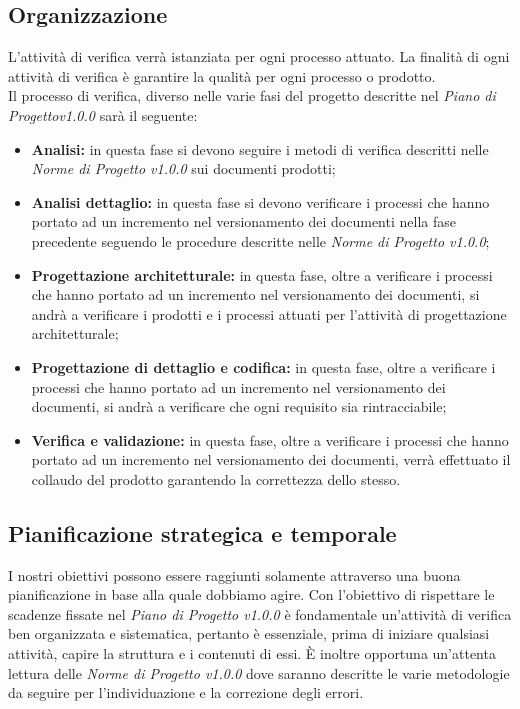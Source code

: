 \subsection{Organizzazione}
L'attività di verifica verrà istanziata per ogni processo attuato. La finalità di ogni attività di verifica è garantire la qualità per ogni processo o prodotto.\\
Il processo di verifica, diverso nelle varie fasi del progetto descritte nel \textit{Piano di Progettov1.0.0} sarà il seguente:
\begin{itemize}
	\item \textbf{Analisi:} in questa fase si devono seguire i metodi di verifica descritti nelle \textit{Norme di Progetto v1.0.0} sui documenti prodotti;
	\item \textbf{Analisi dettaglio:} in questa fase si devono verificare i processi che hanno portato ad un incremento nel versionamento dei documenti nella fase precedente seguendo le procedure descritte nelle \textit{Norme di Progetto v1.0.0};
	\item \textbf{Progettazione architetturale:} in questa fase, oltre a verificare i processi che hanno portato ad un incremento nel versionamento dei documenti, si andrà a verificare i prodotti e i processi attuati per l'attività di progettazione architetturale;
	\item \textbf{Progettazione di dettaglio e codifica:} in questa fase, oltre a verificare i processi che hanno portato ad un incremento nel versionamento dei documenti, si andrà a verificare che ogni requisito sia rintracciabile;
	\item \textbf{Verifica e validazione:} in questa fase, oltre a verificare i processi che hanno portato ad un incremento nel versionamento dei documenti, verrà effettuato il collaudo del prodotto garantendo la correttezza dello stesso.
\end{itemize} 

\subsection{Pianificazione strategica e temporale}
I nostri obiettivi possono essere raggiunti solamente attraverso una buona pianificazione in base alla quale dobbiamo agire. Con l'obiettivo di rispettare le scadenze fissate nel \textit{Piano di Progetto v1.0.0} è fondamentale un'attività di verifica ben organizzata e sistematica, pertanto è essenziale, prima di iniziare qualsiasi attività, capire la struttura e i contenuti di essi. È inoltre opportuna un'attenta lettura delle \textit{Norme di Progetto v1.0.0} dove saranno descritte le varie metodologie da seguire per l'individuazione e la correzione degli errori.

